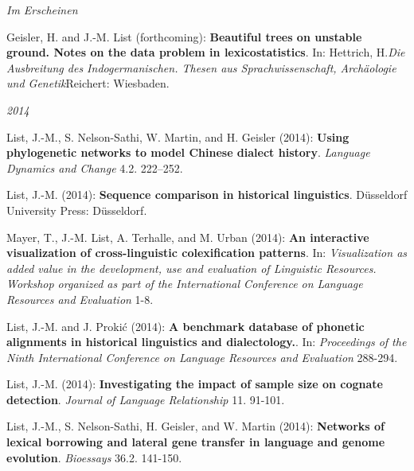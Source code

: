 \noindent\textit{{Im Erscheinen}}\par\nopagebreak\vspace{0.25cm}
\nopagebreak\noindent Geisler, H. and J.-M. List (forthcoming): \textbf{Beautiful trees on unstable ground. Notes on the data problem in lexicostatistics}. In: Hettrich, H.\textit{Die Ausbreitung des Indogermanischen. Thesen aus Sprachwissenschaft, Archäologie und Genetik}Reichert: Wiesbaden. \vspace{0.25cm}
\par
\noindent\textit{2014}\par\nopagebreak\vspace{0.25cm}
\nopagebreak\noindent List, J.-M., S. Nelson-Sathi, W. Martin, and H. Geisler (2014): \textbf{Using phylogenetic networks to model Chinese dialect history}. \textit{Language Dynamics and Change} 4.2. 222–252.\vspace{0.25cm}
\par
\nopagebreak\noindent List, J.-M. (2014): \textbf{Sequence comparison in historical linguistics}. Düsseldorf University Press: Düsseldorf.\vspace{0.25cm}
\par
\nopagebreak\noindent Mayer, T., J.-M. List, A. Terhalle, and M. Urban (2014): \textbf{An interactive visualization of cross-linguistic colexification patterns}. In: \textit{Visualization as added value in the development, use and evaluation of Linguistic Resources. Workshop organized as part of the International Conference on Language Resources and Evaluation} 1-8.\vspace{0.25cm}
\par
\nopagebreak\noindent List, J.-M. and J. Prokić (2014): \textbf{A benchmark database of phonetic alignments in historical linguistics and dialectology.}. In: \textit{Proceedings of the Ninth International Conference on Language Resources and Evaluation} 288-294.\vspace{0.25cm}
\par
\nopagebreak\noindent List, J.-M. (2014): \textbf{Investigating the impact of sample size on cognate detection}. \textit{Journal of Language Relationship} 11. 91-101.\vspace{0.25cm}
\par
\nopagebreak\noindent List, J.-M., S. Nelson-Sathi, H. Geisler, and W. Martin (2014): \textbf{Networks of lexical borrowing and lateral gene transfer in language and genome evolution}. \textit{Bioessays} 36.2. 141-150.\vspace{0.25cm}
\par
